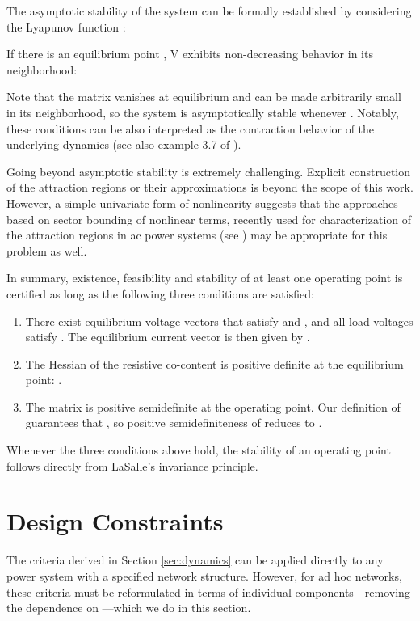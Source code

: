 \documentclass[letterpaper, 10 pt, conference]{ieeeconf}
\begin{document}
The asymptotic stability of the system can be formally established by considering the Lyapunov function :
 
If there is an equilibrium point , V exhibits non-decreasing behavior in its neighborhood:

Note that the matrix  vanishes at equilibrium and can be made arbitrarily small in its neighborhood, so the system is asymptotically stable whenever . Notably, these conditions can be also interpreted as the contraction behavior of the underlying dynamics \cite{Feijer:2010ia,lohmiller1998contraction} (see also example 3.7 of \cite{slotine2003modular}).

Going beyond asymptotic stability is extremely challenging. Explicit construction of the attraction regions or their approximations is beyond the scope of this work. However, a simple univariate form of nonlinearity  suggests that the approaches based on sector bounding of nonlinear terms, recently used for characterization of the attraction regions in ac power systems (see \cite{Vu:2015uv, Vu:2015vfb}) may be appropriate for this problem as well.

In summary, existence, feasibility and stability of at least one operating point is certified as long as the following three conditions are satisfied:
\begin{enumerate}
	\item There exist equilibrium voltage vectors  that satisfy  and , and all load voltages satisfy . The equilibrium current vector is then given by . 
    \item The Hessian of the resistive co-content is positive definite at the equilibrium point: .
    \item The matrix  is positive semidefinite at the operating point. Our definition of  guarantees that , so positive semidefiniteness of  reduces to .
\end{enumerate}
Whenever the three conditions above hold, the stability of an operating point follows directly from LaSalle's invariance principle.

\section{Design Constraints}\label{sec:existence} 

The criteria derived in Section \ref{sec:dynamics} can be applied directly to any power system with a specified network structure. However, for ad hoc networks, these criteria must be reformulated in terms of individual components---removing the dependence on ---which we do in this section.
\end{document}
